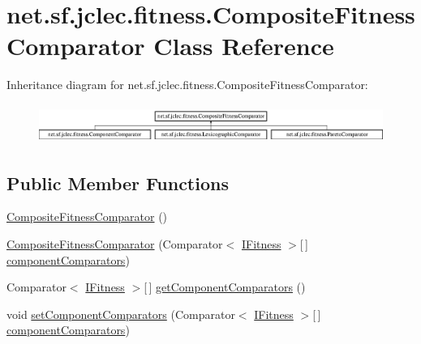 \hypertarget{classnet_1_1sf_1_1jclec_1_1fitness_1_1_composite_fitness_comparator}{\section{net.\-sf.\-jclec.\-fitness.\-Composite\-Fitness\-Comparator Class Reference}
\label{classnet_1_1sf_1_1jclec_1_1fitness_1_1_composite_fitness_comparator}
}
Inheritance diagram for net.\-sf.\-jclec.\-fitness.\-Composite\-Fitness\-Comparator\-:\begin{figure}[H]
\begin{center}
\leavevmode
\includegraphics[height=1.287356cm]{classnet_1_1sf_1_1jclec_1_1fitness_1_1_composite_fitness_comparator}
\end{center}
\end{figure}
\subsection*{Public Member Functions}
\begin{DoxyCompactItemize}
\item 
\hyperlink{classnet_1_1sf_1_1jclec_1_1fitness_1_1_composite_fitness_comparator_a06415294cd3b7e0a3c55106c386e24dc}{Composite\-Fitness\-Comparator} ()
\item 
\hyperlink{classnet_1_1sf_1_1jclec_1_1fitness_1_1_composite_fitness_comparator_ac2a8fda5aba7a8d4c311c799e04a5399}{Composite\-Fitness\-Comparator} (Comparator$<$ \hyperlink{interfacenet_1_1sf_1_1jclec_1_1_i_fitness}{I\-Fitness} $>$\mbox{[}$\,$\mbox{]} \hyperlink{classnet_1_1sf_1_1jclec_1_1fitness_1_1_composite_fitness_comparator_a8448c857b752923973aba83432b52253}{component\-Comparators})
\item 
Comparator$<$ \hyperlink{interfacenet_1_1sf_1_1jclec_1_1_i_fitness}{I\-Fitness} $>$\mbox{[}$\,$\mbox{]} \hyperlink{classnet_1_1sf_1_1jclec_1_1fitness_1_1_composite_fitness_comparator_adc84063f52e886c2ae95bc610eac7b43}{get\-Component\-Comparators} ()
\item 
void \hyperlink{classnet_1_1sf_1_1jclec_1_1fitness_1_1_composite_fitness_comparator_ab8078b469b029ce1e96a596e0c90b57d}{set\-Component\-Comparators} (Comparator$<$ \hyperlink{interfacenet_1_1sf_1_1jclec_1_1_i_fitness}{I\-Fitness} $>$\mbox{[}$\,$\mbox{]} \hyperlink{classnet_1_1sf_1_1jclec_1_1fitness_1_1_composite_fitness_comparator_a8448c857b752923973aba83432b52253}{component\-Comparators})
\end{DoxyCompactItemize}
